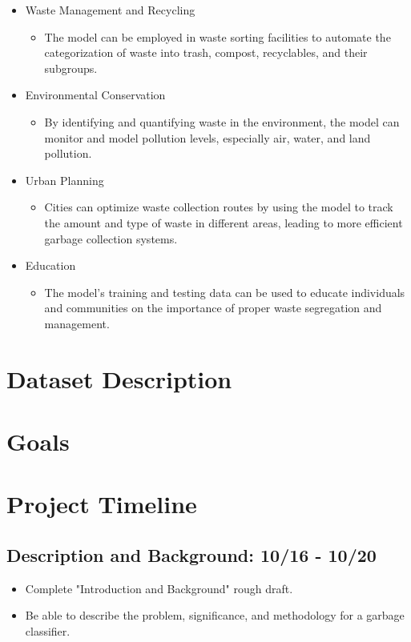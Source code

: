 \documentclass[conference]{IEEEtran}
\begin{document}
\begin{itemize}
  \item Waste Management and Recycling    
    \begin{itemize}
      \item The model can be employed in waste sorting facilities to automate the categorization of waste into trash, compost, recyclables, and their subgroups.
    \end{itemize} 
  \item Environmental Conservation
    \begin{itemize}
      \item By identifying and quantifying waste in the environment, the model can monitor and model pollution levels, especially air, water, and land pollution.
    \end{itemize}
  \item Urban Planning
    \begin{itemize}
      \item Cities can optimize waste collection routes by using the model to track the amount and type of waste in different areas, leading to more efficient garbage collection systems. 
    \end{itemize}
  \item Education
    \begin{itemize}
      \item The model’s training and testing data can be used to educate individuals and communities on the importance of proper waste segregation and management. 
    \end{itemize}
\end{itemize}


\section{Dataset Description}

\section{Goals}

\section{Project Timeline}
\subsection{\textbf{Description and Background: 10/16 - 10/20}}
\begin{itemize}
    \item Complete "Introduction and Background" rough draft.
    \item Be able to describe the problem, significance, and methodology for a garbage classifier.
\end{itemize}
\end{document}
